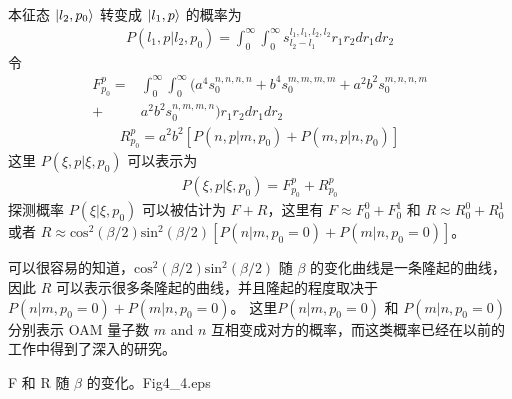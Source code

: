 \documentclass[master]{thesis-uestc}
\begin{document}
\noindent 本征态 $\ket{l_{2},p_0}$ 转变成 $\ket{l_{1},p}$ 的概率为 \cite{Giovannini2011}
\begin{equation}
  \begin{split}
P(l_{1},p|l_{2},p_0)=\int_0^{\infty}\int_0^{\infty}s^{l_{1},l_{1},l_{2},l_{2}}_{l_{2}-l_{1}}r_{1}r_{2}dr_{1}dr_{2}
  \label{A4}
 \end{split}
\end{equation}
\noindent 令
\begin{equation}
  \begin{split}
F_{p_0}^p=&\int_0^{\infty}\int_0^{\infty}(a^{4}s^{n,n,n,n}_{0}+b^{4}s^{m,m,m,m}_{0}+a^{2}b^{2}s^{m,n,n,m}_{0}\\
   +&a^{2}b^{2}s^{n,m,m,n}_{0})r_{1}r_{2}dr_{1}dr_{2}
\label{A5}
 \end{split}
\end{equation}
\begin{equation}
  \begin{split}
R_{p_0}^p=a^{2}b^{2}[P(n,p|m,p_0)+P(m,p|n,p_0)]
 \label{A6}
 \end{split}
\end{equation}
\noindent 这里 $P(\xi,p|\xi,p_0)$ 可以表示为
\begin{equation}
  \begin{split}
P(\xi,p|\xi,p_0)=F_{p_0}^p+R_{p_0}^p
 \label{A7}
 \end{split}
\end{equation}
\noindent 探测概率 $P(\xi|\xi,p_0)$ 可以被估计为 $F+R$，这里有 $F\approx F_{0}^0+F_{0}^1$ 和 $R\approx R_{0}^0+R_{0}^1$ 或者 $R\approx \mathrm{cos}^2\left(\beta/2\right)\mathrm{sin}^2\left(\beta/2\right)[P(n|m,p_0=0)+P(m|n,p_0=0)]$。

可以很容易的知道，$\mathrm{cos}^2\left(\beta/2\right)\mathrm{sin}^2\left(\beta/2\right)$ 随 $\beta$ 的变化曲线是一条隆起的曲线，因此 $R$ 可以表示很多条隆起的曲线，并且隆起的程度取决于 $P(n|m,p_0=0)+P(m|n,p_0=0)$。 这里$P(n|m,p_0=0)$ 和 $P(m|n,p_0=0)$ 分别表示 OAM 量子数 $m$ and $n$ 互相变成对方的概率，而这类概率已经在以前的工作中得到了深入的研究。

\begin{pics}[H]{F 和 R 随 $\beta$ 的变化。}{Fig4_4.eps}
\end{pics}
\end{document}
